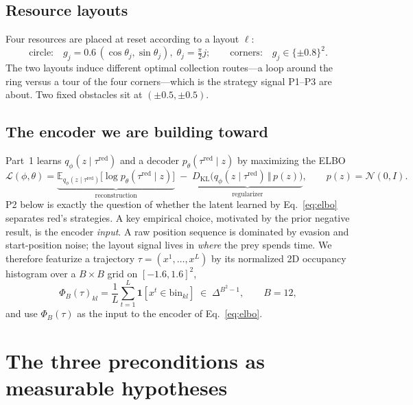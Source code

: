 \documentclass[11pt]{article}
\newcommand{\expect}{\mathbb{E}}
\newcommand{\kl}{D_{\mathrm{KL}}}
\newcommand{\occ}{\Phi}
\newcommand{\zlat}{z}
\newcommand{\tred}{\tau^{\mathrm{red}}}
\begin{document}
\subsection{Resource layouts}

Four resources are placed at reset according to a layout $\ell$:
\begin{equation}
  \text{circle:}\quad g_j = 0.6\,(\cos\theta_j, \sin\theta_j),\;
  \theta_j = \tfrac{\pi}{2} j;
  \qquad
  \text{corners:}\quad g_j \in \{\pm 0.8\}^2 .
\end{equation}
The two layouts induce different optimal collection routes---a loop around the
ring versus a tour of the four corners---which is the strategy signal P1--P3 are
about. Two fixed obstacles sit at $(\pm 0.5, \pm 0.5)$.

\subsection{The encoder we are building toward}

Part~1 learns $q_\phi(\zlat \mid \tred)$ and a decoder $p_\theta(\tred \mid
\zlat)$ by maximizing the ELBO
\begin{equation}
  \mathcal{L}(\phi,\theta)
  = \underbrace{\expect_{q_\phi(\zlat \mid \tred)}
      \big[\log p_\theta(\tred \mid \zlat)\big]}_{\text{reconstruction}}
  \;-\; \underbrace{\kl\!\big(q_\phi(\zlat \mid \tred)\,\Vert\,p(\zlat)\big)}_{\text{regularizer}},
  \qquad p(\zlat) = \mathcal{N}(0, I).
  \label{eq:elbo}
\end{equation}
P2 below is exactly the question of whether the latent learned by
Eq.~\eqref{eq:elbo} separates red's strategies. A key empirical choice, motivated
by the prior negative result, is the encoder \emph{input}. A raw position
sequence is dominated by evasion and start-position noise; the layout signal
lives in \emph{where} the prey spends time. We therefore featurize a trajectory
$\tau = (x^1,\dots,x^L)$ by its normalized 2D occupancy histogram over a
$B \times B$ grid on $[-1.6, 1.6]^2$,
\begin{equation}
  \occ_B(\tau)_{kl} = \frac{1}{L}\sum_{t=1}^{L}
    \mathbf{1}\!\left[x^t \in \mathrm{bin}_{kl}\right]
  \;\in\; \Delta^{B^2-1},
  \qquad B = 12,
  \label{eq:occ}
\end{equation}
and use $\occ_B(\tau)$ as the input to the encoder of Eq.~\eqref{eq:elbo}.


\section{The three preconditions as measurable hypotheses}
\end{document}
